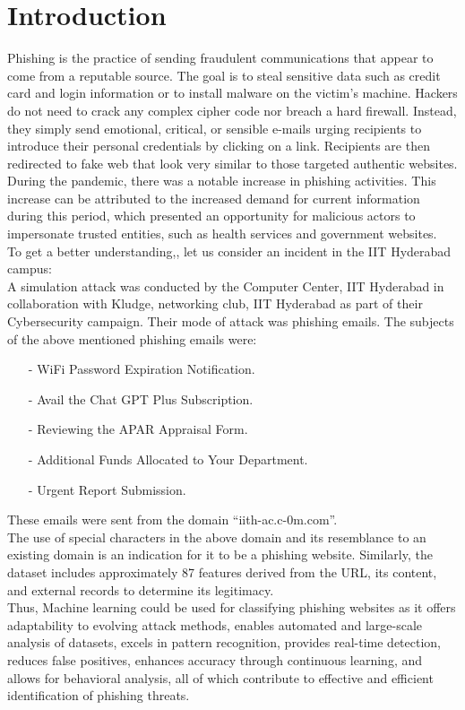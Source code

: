\section{Introduction}
Phishing is the practice of sending fraudulent communications that appear to come from a reputable source. The goal is to steal sensitive data such as credit card and login information or to install malware on the victim’s machine. Hackers do not need to crack any complex cipher code nor breach a hard firewall. Instead, they simply send emotional, critical, or sensible e-mails urging recipients to introduce their personal credentials by clicking on a link. Recipients are then redirected to fake web that look very similar to those targeted authentic websites.\\
During the pandemic, there was a notable increase in phishing activities. This increase can be attributed to the increased demand for current information during this period, which presented an opportunity for malicious actors to impersonate trusted entities, such as health services and government websites.\\
To get a better understanding,, let us consider an incident in the IIT Hyderabad campus:\\
A simulation attack was conducted by the Computer Center, IIT Hyderabad in collaboration with Kludge, networking club, IIT Hyderabad as part of their Cybersecurity campaign.
Their mode of attack was phishing emails. The subjects of
the above mentioned phishing emails were:\\
 \begin{itemize}
     \item[-]WiFi Password Expiration Notification.
     \item[-]Avail the Chat GPT Plus Subscription.
     \item[-]Reviewing the APAR Appraisal Form.
     \item[-]Additional Funds Allocated to Your Department.
     \item[-]Urgent Report Submission.
 \end{itemize}
 These emails were sent from the domain “iith-ac.c-0m.com”.\\
 The use of special characters in the above domain and its resemblance to an existing domain is an indication for it to be a phishing website. Similarly, the dataset includes approximately 87 features derived from the URL, its content, and external records to determine its legitimacy.\\
Thus, Machine learning could be used for classifying phishing websites as it offers adaptability to evolving attack methods, enables automated and large-scale analysis of datasets, excels in pattern recognition, provides real-time
detection, reduces false positives, enhances accuracy through continuous learning, and allows for behavioral analysis, all of which contribute to effective and efficient identification of phishing threats.